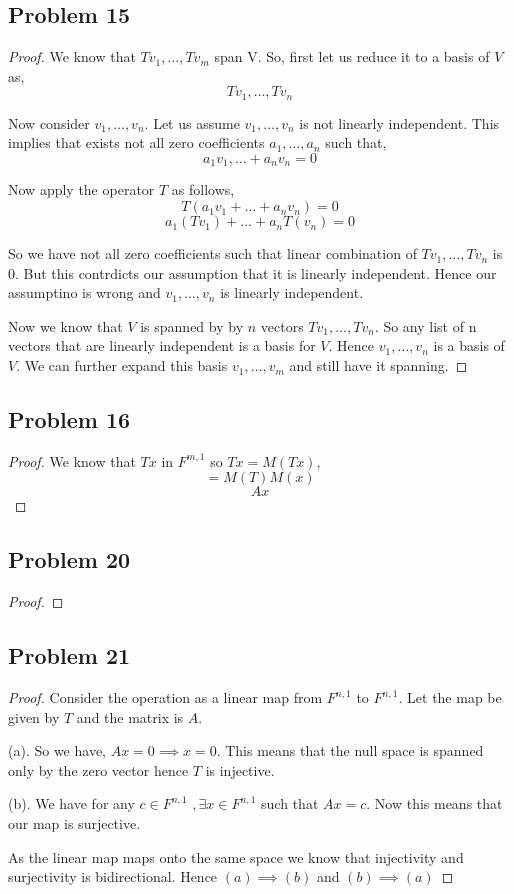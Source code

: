 \documentclass[a4paper]{report}
\begin{document}
\subsection*{Problem 15}
\begin{proof}
    We know that $Tv_1,\dots,Tv_m$ span V. So, first let us reduce it to a basis of $V$ as, 
    $$ Tv_1,\dots,Tv_n $$

    Now consider $v_1,\dots,v_n$. Let us assume $v_1,\dots,v_n$ is not linearly independent. This implies that exists not all zero coefficients $a_1,\dots,a_n$ such that, 
    $$ a_1v_1,\dots + a_nv_n = 0 $$ 

    Now apply the operator $T$ as follows,
    $$ T(a_1v_1 + \dots + a_nv_n) = 0 $$ 
    $$ a_1(Tv_1) + \dots + a_nT(v_n) = 0 $$ 

    So we have not all zero coefficients such that linear combination of $Tv_1,\dots,Tv_n$ is 0. But this contrdicts our assumption that it is linearly independent. Hence our assumptino is wrong and $v_1,\dots,v_n$ is linearly independent.

    Now we know that $V$ is spanned by by $n$ vectors $Tv_1,\dots,Tv_n$. So any list of n vectors that are linearly independent is a basis for $V$.  Hence $v_1,\dots,v_n$ is a basis of $V$. We can further expand this basis $v_1,\dots,v_m$ and still have it spanning.
\end{proof}
\subsection*{Problem 16}
\begin{proof}
    
    We know that $Tx$ in $F^{m,1}$ so $Tx = M(Tx)$,  
    $$ = M(T)M(x) $$ 
    $$ Ax $$ 
\end{proof}
\subsection*{Problem 20}
\begin{proof}
    
\end{proof}
\subsection*{Problem 21}
\begin{proof}
    Consider the operation as a linear map from $F^{n,1}$ to $F^{n,1}$. Let the map be given by $T$ and the matrix is $A$. 

    (a). So we have, $Ax = 0 \implies x = 0$. This means that the null space is spanned only by the zero vector hence  $T$ is injective.

    (b). We have for any $c \in F^{n,1}$ $,\exists x \in F^{n,1}$ such that $Ax = c$. Now this means that our map is surjective. 

    As the linear map maps onto the same space we know that injectivity and surjectivity is bidirectional. Hence $(a) \implies (b)$ and  $(b) \implies (a)$
    
\end{proof}
\end{document}
